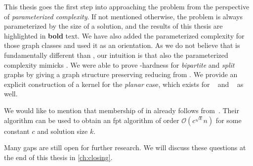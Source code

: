 This thesis goes the first step into approaching the problem from the perspective of \textit{parameterized complexity}.
If not mentioned otherwise, the problem is always parameterized by the size of a solution, and the results of this thesis are highlighted in \textbf{bold} text.
We have also added the parameterized complexity for those graph classes and used it as an orientation.
As we do not believe that \sdoms is fundamentally different than \doms, our intuition is that also the parameterized complexity mimicks \sdoms. 
We were able to prove \WTWO-hardness for \textit{bipartite} and \textit{split} graphs by giving a graph structure preserving reducing from \doms. We provide an explicit construction of a kernel for the \textit{planar} case, which exists for \doms~\cite{Alber2004} and \tdoms~\cite{Garnero2019} as well.

We would like to mention that membership of \psdom in \FPT already follows from~\cite{Alber2002}.
Their algorithm \pdomp can be used to obtain an fpt algorithm of order $\mathcal{O}(c^{\sqrt{k}}n)$ for some constant $c$ and solution size $k$.

Many gaps are still open for further research.
We will discuss these questions at the end of this thesis in \cref{ch:closing}.


